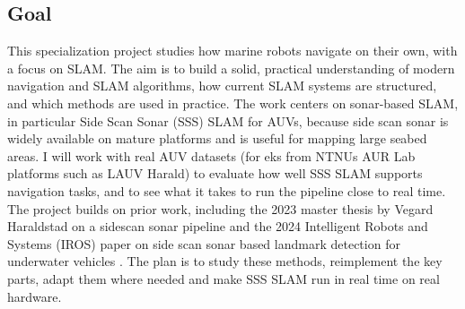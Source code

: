 \subsection{Goal}
This specialization project studies how marine robots navigate on their own, with a focus on \gls{SLAM}. The aim is to build a solid, practical understanding of modern navigation and \gls{SLAM} algorithms, how current \gls{SLAM} systems are structured, and which methods are used in practice. The work centers on sonar-based \gls{SLAM}, in particular Side Scan Sonar (SSS) \gls{SLAM} for \gls{AUV}s, because side scan sonar is widely available on mature platforms and is useful for mapping large seabed areas. I will work with real \gls{AUV} datasets (for eks from NTNUs \gls{AUR Lab} platforms such as \gls{LAUV} Harald) to evaluate how well \gls{SSS SLAM} supports navigation tasks, and to see what it takes to run the pipeline close to real time. The project builds on prior work, including the 2023 master thesis by Vegard Haraldstad on a sidescan sonar pipeline \cite{side_scan_sonar_master_thesis} and the 2024 Intelligent Robots and Systems (IROS) paper on side scan sonar based landmark detection for underwater vehicles \cite{side_scan_sonar_paper}. The plan is to study these methods, reimplement the key parts, adapt them where needed and make \gls{SSS SLAM} run in real time on real hardware.